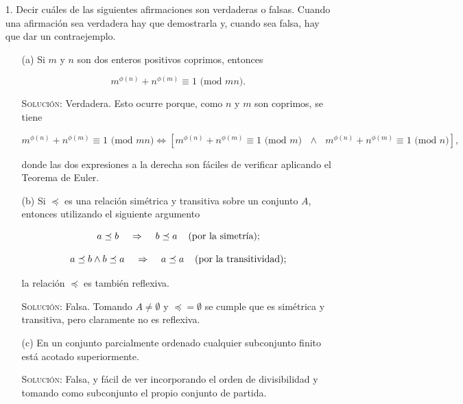 \documentclass{article}
\begin{document}
\begin{enumerate}
    \item[1.] Decir cuáles de las siguientes afirmaciones son verdaderas o falsas. Cuando una afirmación sea verdadera hay que demostrarla y, cuando sea falsa, hay que dar un contraejemplo.

    \begin{enumerate}
        \item[(a)] Si $m$ y $n$ son dos enteros positivos coprimos, entonces

        \[m^{\phi(n)} + n^{\phi(m)} \equiv 1 \text{ (mod }mn).\]

        \textsc{Solución:} Verdadera. Esto ocurre porque, como $n$ y $m$ son coprimos, se tiene

        \[m^{\phi(n)} + n^{\phi(m)} \equiv 1 \text{ (mod }mn) \iff [m^{\phi(n)} + n^{\phi(m)} \equiv 1 \text{ (mod }m) \text{ } \land \text{ } m^{\phi(n)} + n^{\phi(m)} \equiv 1 \text{ (mod }n)],\]

        donde las dos expresiones a la derecha son fáciles de verificar aplicando el Teorema de Euler.

        \item[(b)] Si $\preceq$ es una relación simétrica y transitiva sobre un conjunto $A$, entonces utilizando el siguiente argumento 

        \[a \preceq b \hspace{0.4cm} \Rightarrow \hspace{0.4cm} b \preceq a \hspace{0.4cm} \text{(por la simetría);}\]

        \[a \preceq b \land b \preceq a \hspace{0.4cm} \Rightarrow \hspace{0.4cm} a \preceq a \hspace{0.4cm} \text{(por la transitividad);}\]

        la relación $\preceq$ es también reflexiva.

        \textsc{Solución:} Falsa. Tomando $A \neq \emptyset$ y $\preceq = \emptyset$ se cumple que es simétrica y transitiva, pero claramente no es reflexiva.

        \item[(c)] En un conjunto parcialmente ordenado cualquier subconjunto finito está acotado superiormente.

        \textsc{Solución:} Falsa, y fácil de ver incorporando el orden de divisibilidad y tomando como subconjunto el propio conjunto de partida.


\end{enumerate}
\end{enumerate}
\end{document}
